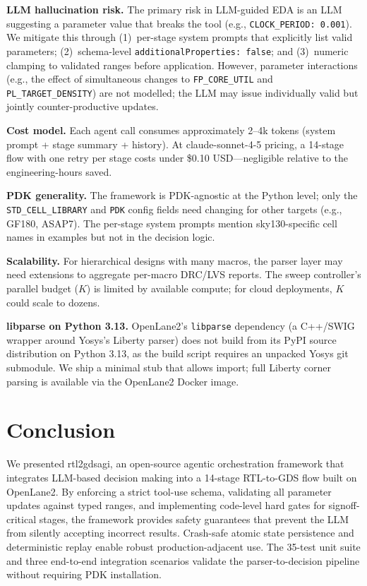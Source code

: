 \documentclass[conference]{IEEEtran}
\begin{document}
\textbf{LLM hallucination risk.}
The primary risk in LLM-guided EDA is an LLM suggesting a parameter
value that breaks the tool (e.g., \texttt{CLOCK\_PERIOD: 0.001}).
We mitigate this through (1)~per-stage system prompts that explicitly
list valid parameters; (2)~schema-level \texttt{additionalProperties: false};
and (3)~numeric clamping to validated ranges before application.
However, parameter interactions (e.g., the effect of simultaneous
changes to \texttt{FP\_CORE\_UTIL} and \texttt{PL\_TARGET\_DENSITY})
are not modelled; the LLM may issue individually valid but jointly
counter-productive updates.

\textbf{Cost model.}
Each agent call consumes approximately 2--4k tokens (system prompt +
stage summary + history).
At claude-sonnet-4-5 pricing, a 14-stage flow with one retry per stage
costs under \$0.10 USD—negligible relative to the engineering-hours saved.

\textbf{PDK generality.}
The framework is PDK-agnostic at the Python level; only the
\texttt{STD\_CELL\_LIBRARY} and \texttt{PDK} config fields need
changing for other targets (e.g., GF180, ASAP7).
The per-stage system prompts mention sky130-specific cell names in
examples but not in the decision logic.

\textbf{Scalability.}
For hierarchical designs with many macros, the parser layer may need
extensions to aggregate per-macro DRC/LVS reports.
The sweep controller's parallel budget ($K$) is limited by available
compute; for cloud deployments, $K$ could scale to dozens.

\textbf{libparse on Python 3.13.}
OpenLane2's \texttt{libparse} dependency (a C++/SWIG wrapper around
Yosys's Liberty parser) does not build from its PyPI source
distribution on Python 3.13, as the build script requires an
unpacked Yosys git submodule.
We ship a minimal stub that allows import; full Liberty corner
parsing is available via the OpenLane2 Docker image.

\section{Conclusion}

We presented rtl2gdsagi, an open-source agentic orchestration
framework that integrates LLM-based decision making into a
14-stage RTL-to-GDS flow built on OpenLane2.
By enforcing a strict tool-use schema, validating all parameter
updates against typed ranges, and implementing code-level hard gates
for signoff-critical stages, the framework provides safety
guarantees that prevent the LLM from silently accepting incorrect
results.
Crash-safe atomic state persistence and deterministic replay
enable robust production-adjacent use.
The 35-test unit suite and three end-to-end integration scenarios
validate the parser-to-decision pipeline without requiring PDK
installation.
\end{document}
